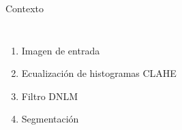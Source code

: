 \documentclass[15pt]{beamer} %
\begin{document}
\begin{frame}{Contexto}

\begin{columns}
    \begin{enumerate}
    \item <1-| alert@1> Imagen de entrada
    \item <2-| alert@2> Ecualizaci\'on de histogramas CLAHE
    \item <3-| alert@3> Filtro DNLM
    \item <4-| alert@4> Segmentaci\'on
    \end{enumerate}

\end{columns}
\end{frame}
\end{document}
